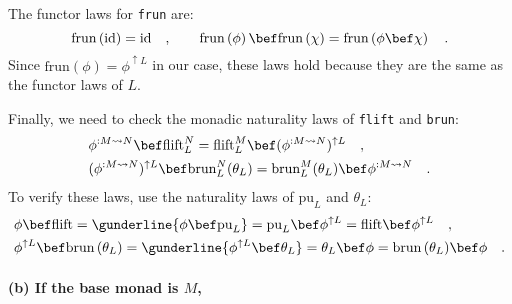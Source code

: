 The functor laws for \lstinline!frun! are:
\[
\text{frun}\left(\text{id}\right)=\text{id}\quad,\quad\quad\text{frun}\left(\phi\right)\bef\text{frun}\left(\chi\right)=\text{frun}\left(\phi\bef\chi\right)\quad.
\]
Since $\text{frun}\left(\phi\right)=\phi^{\uparrow L}$ in our case,
these laws hold because they are the same as the functor laws of $L$.

Finally, we need to check the monadic naturality laws of \lstinline!flift!
and \lstinline!brun!:
\begin{align*}
 & \phi^{:M\leadsto N}\bef\text{flift}_{L}^{N}=\text{flift}_{L}^{M}\bef(\phi^{:M\leadsto N})^{\uparrow L}\quad,\\
 & (\phi^{:M\leadsto N})^{\uparrow L}\bef\text{brun}_{L}^{N}(\theta_{L})=\text{brun}_{L}^{M}(\theta_{L})\bef\phi^{:M\leadsto N}\quad.
\end{align*}
To verify these laws, use the naturality laws of $\text{pu}_{L}$
and $\theta_{L}$:
\begin{align*}
 & \phi\bef\text{flift}=\gunderline{\phi\bef\text{pu}_{L}}=\text{pu}_{L}\bef\phi^{\uparrow L}=\text{flift}\bef\phi^{\uparrow L}\quad,\\
 & \phi^{\uparrow L}\bef\text{brun}\,(\theta_{L})=\gunderline{\phi^{\uparrow L}\bef\theta_{L}}=\theta_{L}\bef\phi=\text{brun}\,(\theta_{L})\bef\phi\quad.
\end{align*}


\paragraph{(b) If the base monad is $M$, }

